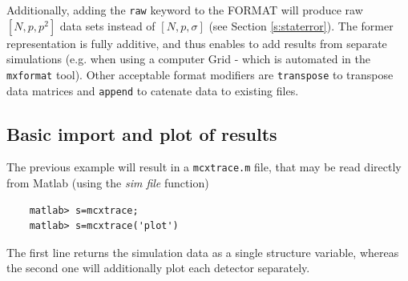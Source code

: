 
Additionally, adding the \texttt{raw} keyword to the FORMAT will produce raw $[N, p, p^2]$ data sets instead of $[N, p, \sigma]$ (see Section \ref{s:staterror}). The former representation is fully additive, and thus enables to add results from separate simulations (e.g. when using a computer Grid - which is automated in the \verb+mxformat+ tool). Other acceptable format modifiers are \verb+transpose+ to transpose data matrices and \verb+append+ to catenate data to existing files.

\subsection{Basic import and plot of results}
\label{s:run-format}
The previous example will result in a \verb+mcxtrace.m+ file, that may be read directly from Matlab (using the {\it sim file} function)
\begin{verbatim}
    matlab> s=mcxtrace;
    matlab> s=mcxtrace('plot')
\end{verbatim} 
The first line returns the simulation data as a single structure variable, whereas the second one will additionally plot each detector separately.

